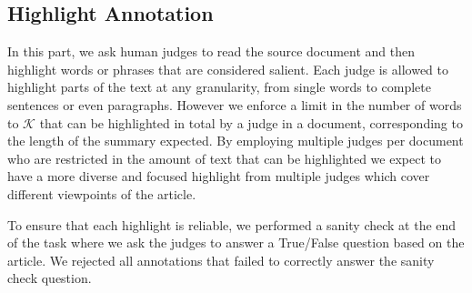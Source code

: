 \documentclass[11pt,a4paper]{article}
\begin{document}


\subsection{Highlight Annotation}
\label{subsec:hannot}
In this part, we ask human judges to read the source document and then highlight words or phrases that are considered salient. %
Each judge is allowed to highlight parts of the text at any granularity, from single words to complete sentences or even paragraphs. However we enforce a limit in the number of words to $\mathcal{K}$ that can be highlighted in total by a judge in a document, corresponding to the length of the summary expected.
By employing multiple judges per document who are restricted in the amount of text that can be highlighted  we expect to have a more diverse and focused highlight from multiple judges which cover different viewpoints of the article.

To ensure that each highlight is reliable, we performed a sanity check at the end of the task where we ask the judges to answer a True/False question based on the article. We rejected all annotations that failed to correctly answer the sanity check question. 

\end{document}
